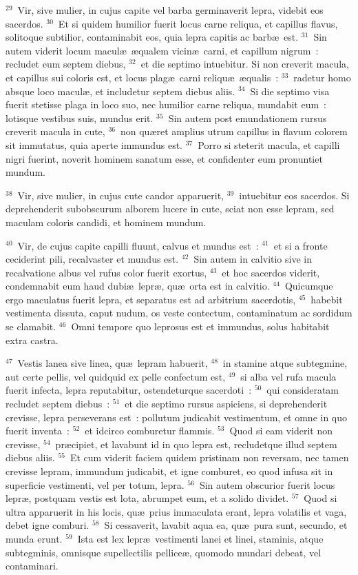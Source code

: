 ${}^{29}$~Vir, sive mulier, in cujus capite vel barba germinaverit lepra, videbit eos sacerdos.
${}^{30}$~Et si quidem humilior fuerit locus carne reliqua, et capillus flavus, solitoque subtilior, contaminabit eos, quia lepra capitis ac barb\ae\ est.
${}^{31}$~Sin autem viderit locum macul\ae\ \ae qualem vicin\ae\ carni, et capillum nigrum~: recludet eum septem diebus,
${}^{32}$~et die septimo intuebitur. Si non creverit macula, et capillus sui coloris est, et locus plag\ae\ carni reliqu\ae\ \ae qualis~:
${}^{33}$~radetur homo absque loco macul\ae , et includetur septem diebus aliis.
${}^{34}$~Si die septimo visa fuerit stetisse plaga in loco suo, nec humilior carne reliqua, mundabit eum~: lotisque vestibus suis, mundus erit.
${}^{35}$~Sin autem post emundationem rursus creverit macula in cute,
${}^{36}$~non qu\ae ret amplius utrum capillus in flavum colorem sit immutatus, quia aperte immundus est.
${}^{37}$~Porro si steterit macula, et capilli nigri fuerint, noverit hominem sanatum esse, et confidenter eum pronuntiet mundum.


${}^{38}$~Vir, sive mulier, in cujus cute candor apparuerit,
${}^{39}$~intuebitur eos sacerdos. Si deprehenderit subobscurum alborem lucere in cute, sciat non esse lepram, sed maculam coloris candidi, et hominem mundum.


${}^{40}$~Vir, de cujus capite capilli fluunt, calvus et mundus est~:
${}^{41}$~et si a fronte ceciderint pili, recalvaster et mundus est.
${}^{42}$~Sin autem in calvitio sive in recalvatione albus vel rufus color fuerit exortus,
${}^{43}$~et hoc sacerdos viderit, condemnabit eum haud dubi\ae\ lepr\ae , qu\ae\ orta est in calvitio.
${}^{44}$~Quicumque ergo maculatus fuerit lepra, et separatus est ad arbitrium sacerdotis,
${}^{45}$~habebit vestimenta dissuta, caput nudum, os veste contectum, contaminatum ac sordidum se clamabit.
${}^{46}$~Omni tempore quo leprosus est et immundus, solus habitabit extra castra.


${}^{47}$~Vestis lanea sive linea, qu\ae\ lepram habuerit,
${}^{48}$~in stamine atque subtegmine, aut certe pellis, vel quidquid ex pelle confectum est,
${}^{49}$~si alba vel rufa macula fuerit infecta, lepra reputabitur, ostendeturque sacerdoti~:
${}^{50}$~qui consideratam recludet septem diebus~:
${}^{51}$~et die septimo rursus aspiciens, si deprehenderit crevisse, lepra perseverans est~: pollutum judicabit vestimentum, et omne in quo fuerit inventa~:
${}^{52}$~et idcirco comburetur flammis.
${}^{53}$~Quod si eam viderit non crevisse,
${}^{54}$~pr\ae cipiet, et lavabunt id in quo lepra est, recludetque illud septem diebus aliis.
${}^{55}$~Et cum viderit faciem quidem pristinam non reversam, nec tamen crevisse lepram, immundum judicabit, et igne comburet, eo quod infusa sit in superficie vestimenti, vel per totum, lepra.
${}^{56}$~Sin autem obscurior fuerit locus lepr\ae , postquam vestis est lota, abrumpet eum, et a solido dividet.
${}^{57}$~Quod si ultra apparuerit in his locis, qu\ae\ prius immaculata erant, lepra volatilis et vaga, debet igne comburi.
${}^{58}$~Si cessaverit, lavabit aqua ea, qu\ae\ pura sunt, secundo, et munda erunt.
${}^{59}$~Ista est lex lepr\ae\ vestimenti lanei et linei, staminis, atque subtegminis, omnisque supellectilis pellice\ae , quomodo mundari debeat, vel contaminari.

